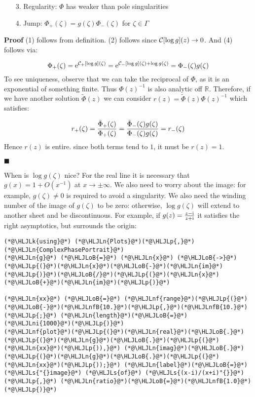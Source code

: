 \documentclass[12pt,landscape]{article}
\newcommand{\HLJLk}[1]{\textcolor[RGB]{148,91,176}{\textbf{#1}}}
\newcommand{\HLJLn}[1]{#1}
\newcommand{\HLJLnf}[1]{\textcolor[RGB]{66,102,213}{#1}}
\newcommand{\HLJLs}[1]{\textcolor[RGB]{201,61,57}{#1}}
\newcommand{\HLJLnfB}[1]{\textcolor[RGB]{59,151,46}{#1}}
\newcommand{\HLJLni}[1]{\textcolor[RGB]{59,151,46}{#1}}
\newcommand{\HLJLoB}[1]{\textcolor[RGB]{102,102,102}{\textbf{#1}}}
\newcommand{\HLJLp}[1]{#1}
\def\I{ {\rm i} }
\def\E{ {\rm e} }
\def\R{ {\mathbb R} }
\def\CC{ {\cal C} }
\begin{document}
{\begin{itemize}
\item[3. ] Regularity: $\Phi$ has weaker than pole singularities


\item[4. ] Jump: $\Phi_+(\zeta) = g(\zeta) \Phi_-(\zeta)$ for $\zeta \in \Gamma$

\end{itemize}
\textbf{Proof} (1) follows from definition. (2) follows since $\CC[\log g](z) \rightarrow 0$. And (4) follows via:

\[
\Phi_+(\zeta) = \E^{\CC_+[\log g](\zeta)} = \E^{\CC_-[\log g](\zeta) + \log g(\zeta)} = \Phi_-(\zeta) g(\zeta)
\]
To see uniqueness, observe that we can take the reciprocal of $\Phi$, as it is an exponential of something finite. Thus $\Phi(z)^{-1}$ is also analytic off $\R$. Therefore, if we have another solution $\tilde \Phi(z)$ we can consider $r(z) = \tilde\Phi(z) \Phi(z)^{-1}$ which satisfies:

\[
r_+(\zeta) = {\tilde\Phi_+(\zeta) \over \Phi_+(\zeta)} = {\tilde\Phi_-(\zeta) g(\zeta) \over \Phi_-(\zeta) g(\zeta)} = r_-(\zeta)
\]
Hence $r(z)$ is entire. since both terms tend to $1$, it must be $r(z) = 1$.

\ensuremath{\blacksquare}

When is $\log g(\zeta)$ nice? For the real line it is necessary that $g(x) = 1 + O(x^{-1})$ at $x \rightarrow \pm \infty$. We also need to worry about the image: for example, $g(\zeta) \neq 0$ is required to avoid a singularity.  We also need the winding number of the image of $g(\zeta)$ to be zero: otherwise, $\log g(\zeta)$ will extend to another sheet and be discontinuous.   For example, if $g(z) = {z-\I \over z+\I}$ it satisfies the right asymptotics, but surrounds the origin:


\begin{lstlisting}
(*@\HLJLk{using}@*) (*@\HLJLn{Plots}@*)(*@\HLJLp{,}@*) (*@\HLJLn{ComplexPhasePortrait}@*)
(*@\HLJLn{g}@*) (*@\HLJLoB{=}@*) (*@\HLJLn{x}@*) (*@\HLJLoB{->}@*) (*@\HLJLp{(}@*)(*@\HLJLn{x}@*)(*@\HLJLoB{-}@*)(*@\HLJLn{im}@*)(*@\HLJLp{)}@*)(*@\HLJLoB{/}@*)(*@\HLJLp{(}@*)(*@\HLJLn{x}@*)(*@\HLJLoB{+}@*)(*@\HLJLn{im}@*)(*@\HLJLp{)}@*)

(*@\HLJLn{xx}@*) (*@\HLJLoB{=}@*) (*@\HLJLnf{range}@*)(*@\HLJLp{(}@*)(*@\HLJLoB{-}@*)(*@\HLJLnfB{10.}@*)(*@\HLJLp{,}@*)(*@\HLJLnfB{10.}@*)(*@\HLJLp{;}@*) (*@\HLJLn{length}@*)(*@\HLJLoB{=}@*)(*@\HLJLni{1000}@*)(*@\HLJLp{)}@*)
(*@\HLJLnf{plot}@*)(*@\HLJLp{(}@*)(*@\HLJLn{real}@*)(*@\HLJLoB{.}@*)(*@\HLJLp{(}@*)(*@\HLJLn{g}@*)(*@\HLJLoB{.}@*)(*@\HLJLp{(}@*)(*@\HLJLn{xx}@*)(*@\HLJLp{)),}@*) (*@\HLJLn{imag}@*)(*@\HLJLoB{.}@*)(*@\HLJLp{(}@*)(*@\HLJLn{g}@*)(*@\HLJLoB{.}@*)(*@\HLJLp{(}@*)(*@\HLJLn{xx}@*)(*@\HLJLp{));}@*) (*@\HLJLn{label}@*)(*@\HLJLoB{=}@*)(*@\HLJLs{"{}image}@*) (*@\HLJLs{of}@*) (*@\HLJLs{(x-i)/(x+i)"{}}@*)(*@\HLJLp{,}@*) (*@\HLJLn{ratio}@*)(*@\HLJLoB{=}@*)(*@\HLJLnfB{1.0}@*)(*@\HLJLp{)}@*)
\end{lstlisting}

}
\end{document}
